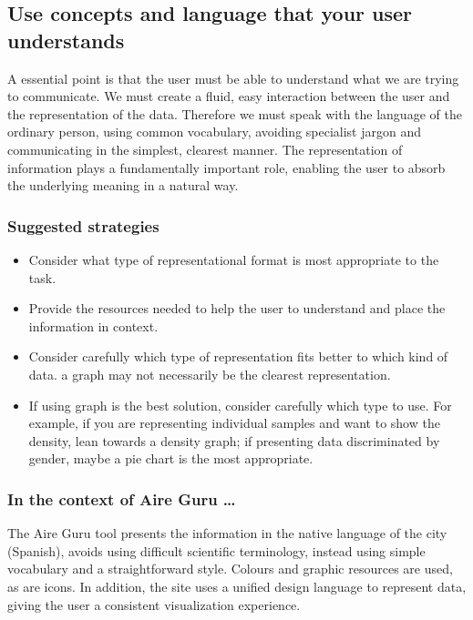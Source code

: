 \subsection{Use concepts and language that your user understands}

A essential point is that the user must be able to understand what we are trying to communicate. We must create a fluid, 
easy interaction between the user and the representation of the data. Therefore we must speak with the language of 
the ordinary person, using common vocabulary, avoiding specialist jargon and communicating in the simplest, 
clearest manner. The representation of information plays a fundamentally important role, enabling the user to absorb 
the underlying meaning in a natural way.\\

\subsubsection*{Suggested strategies} 

\begin{itemize}
    \item Consider what type of representational format is most appropriate to the task.
    
    \item Provide the resources needed to help the user to understand and place the information in context.

    \item Consider carefully which type of representation fits better to which kind of data. a graph may not necessarily be the clearest representation.

    \item If using graph is the best solution, consider carefully which type to use. For example, 
    if you are representing individual samples and want to show the density, lean towards a density graph; if presenting data discriminated by gender,
    maybe a pie chart is the most appropriate.
\end{itemize}

\subsubsection*{In the context of Aire Guru \ldots} 

The Aire Guru tool presents the information in the native language of the city (Spanish), avoids using difficult scientific terminology, instead using simple vocabulary and a 
straightforward style. Colours and graphic resources are used, as are icons. In addition, the site uses a unified design language to represent data,
giving the user a consistent visualization experience. \\

